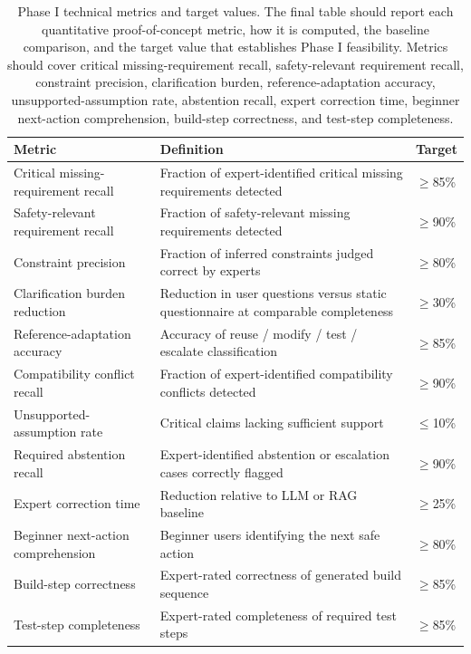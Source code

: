 \begin{table}[H]
\centering
\caption{Phase I technical metrics and target values. The final table should report each quantitative proof-of-concept metric, how it is computed, the baseline comparison, and the target value that establishes Phase I feasibility. Metrics should cover critical missing-requirement recall, safety-relevant requirement recall, constraint precision, clarification burden, reference-adaptation accuracy, unsupported-assumption rate, abstention recall, expert correction time, beginner next-action comprehension, build-step correctness, and test-step completeness.}
\label{tab:phase1_metrics}
\renewcommand{\arraystretch}{1.15}
\small
\begin{tabular}{p{} p{} p{}}
\hline
\textbf{Metric} & \textbf{Definition} & \textbf{Target} \\
\hline
Critical missing-requirement recall & Fraction of expert-identified critical missing requirements detected & $\geq$85\% \\
Safety-relevant requirement recall & Fraction of safety-relevant missing requirements detected & $\geq$90\% \\
Constraint precision & Fraction of inferred constraints judged correct by experts & $\geq$80\% \\
Clarification burden reduction & Reduction in user questions versus static questionnaire at comparable completeness & $\geq$30\% \\
Reference-adaptation accuracy & Accuracy of reuse / modify / test / escalate classification & $\geq$85\% \\
Compatibility conflict recall & Fraction of expert-identified compatibility conflicts detected & $\geq$90\% \\
Unsupported-assumption rate & Critical claims lacking sufficient support & $\leq$10\% \\
Required abstention recall & Expert-identified abstention or escalation cases correctly flagged & $\geq$90\% \\
Expert correction time & Reduction relative to LLM or RAG baseline & $\geq$25\% \\
Beginner next-action comprehension & Beginner users identifying the next safe action & $\geq$80\% \\
Build-step correctness & Expert-rated correctness of generated build sequence & $\geq$85\% \\
Test-step completeness & Expert-rated completeness of required test steps & $\geq$85\% \\
\hline
\end{tabular}
\end{table}

